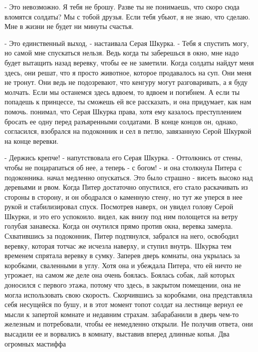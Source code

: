 \par- Это невозможно. Я тебя не брошу. Разве ты не понимаешь, что 
скоро сюда вломятся солдаты? Мы с тобой друзья. Если тебя убьют, я не 
знаю, что сделаю. Мне в жизни не будет ни минуты счастья.
\par- Это единственный выход, - настаивала Серая Шкурка. - Тебя я 
спустить могу, но самой мне спускаться нельзя. Ведь когда ты 
заберешься в окно, мне надо будет вытащить назад веревку, чтобы ее не 
заметили. Когда солдаты найдут меня здесь, они решат, что я просто 
животное, которое продавалось на суп. Они меня не тронут. Они ведь не 
подозревают, что кенгуру могут разговаривать, а я буду молчать. Если 
мы останемся здесь вдвоем, то вдвоем и погибнем. А если ты попадешь к 
принцессе, ты сможешь ей все рассказать, и она придумает, как нам 
помочь.
 понимал, что Серая Шкурка права, хотя ему казалось 
преступлением бросать ее одну перед разъяренными солдатами. В конце 
концов он, однако, согласился, взобрался на подоконник и сел в петлю, 
завязанную Серой Шкуркой на конце веревки.
\par- Держись крепче! - напутствовала его Серая Шкурка. - Оттолкнись 
от стены, чтобы не поцарапаться об нее, а теперь - с богом! - и она 
столкнула Питера с подоконника.
 начал медленно опускаться. Это было страшно - висеть высоко 
над деревьями и рвом. Когда Питер достаточно опустился, его стало 
раскачивать из стороны в сторону, и он ободрался о каменную стену, но 
тут же уперся в нее рукой и стабилизировал спуск. Посмотрев наверх, он 
увидел голову Серой Шкурки, и это его успокоило.
 видел, как внизу под ним полощется на ветру голубая 
занавеска. Когда он очутился прямо против окна, веревка замерла. 
Схватившись за подоконник, Питер подтянулся, забрался на него, 
освободил веревку, которая тотчас же исчезла наверху, и ступил внутрь.
 Шкурка тем временем спрятала веревку в сумку. Заперев дверь 
комнаты, она укрылась за коробками, сваленными в углу. Хотя она и 
убеждала Питера, что ей ничто не угрожает, на самом же деле она очень 
боялась. Боялась собак, лай которых доносился с первого этажа, потому 
что здесь, в закрытом помещении, она не могла использовать свою 
скорость. Скорчившись за коробками, она представляла себя несущейся по 
бушу, и в этот момент топот солдат на лестнице вернул ее мысли к 
запертой комнате и недавним страхам.
 забарабанили в дверь чем-то железным и потребовали, чтобы 
ее немедленно открыли. Не получив ответа, они высадили ее и ворвались 
в комнату, выставив вперед длинные копья. Два огромных мастиффа 
